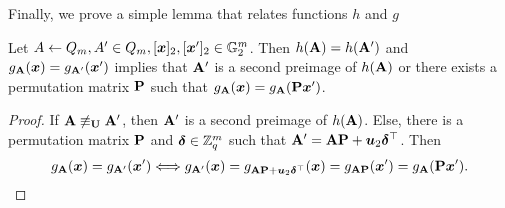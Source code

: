 %
%

Finally, we prove a simple lemma that relates functions $h$ and $g$
\begin{lemma}\label{lemma:hg}
Let $A\gets Q_m,A'\in Q_m,[{\boldsymbol{x}}]_2,[{\boldsymbol{x}}']_2\in\mathbb{G}^m_2$. Then $h(\mathbf{{A}})=h(\mathbf{{A}}')$ and $g_{\mathbf{{A}}}({\boldsymbol{x}})=g_{\mathbf{{A}}'}({\boldsymbol{x}}')$ implies that $\mathbf{{A}}'$ is a second preimage of $h(\mathbf{{A}})$ or there exists a permutation matrix $\mathbf{{P}}$ such that $g_{\mathbf{{A}}}({\boldsymbol{x}})=g_{\mathbf{{A}}}(\mathbf{{P}}{\boldsymbol{x}}')$.
\end{lemma}
\begin{proof}
If $\mathbf{{A}}\not\equiv_{\mathbf{{U}}} \mathbf{{A}}'$, then $\mathbf{{A}}'$ is a second preimage of $h(\mathbf{{A}})$. Else, there is a permutation matrix $\mathbf{{P}}$ and ${\boldsymbol{\delta}}\in\mathbb{Z}_q^m$ such that $\mathbf{{A}}' =\mathbf{{A}}\mathbf{{P}}+{\boldsymbol{u}}_2{\boldsymbol{\delta}}^\top$. Then
$$
 g_{\mathbf{{A}}}({\boldsymbol{x}})=g_{\mathbf{{A}}'}({\boldsymbol{x}}')\Longleftrightarrow  g_{\mathbf{{A}}'}({\boldsymbol{x}})=g_{\mathbf{{A}}\mathbf{{P}}+{\boldsymbol{u}}_2{\boldsymbol{\delta}}^\top}({\boldsymbol{x}})=g_{\mathbf{{A}}\mathbf{{P}}}({\boldsymbol{x}}')=g_{\mathbf{{A}}}(\mathbf{{P}}{\boldsymbol{x}}').
$$
\end{proof}